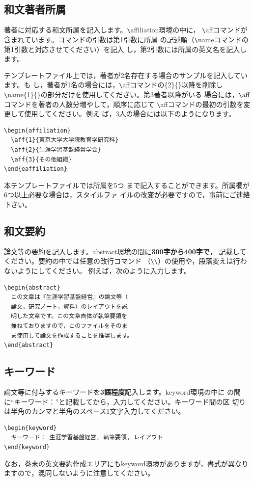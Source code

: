 \documentclass[b5paper,10pt,twocolumn,tombow]{jarticle}
\begin{document}
\subsection{和文著者所属}
著者に対応する和文所属を記入します。\verb|\|affiliation環境の中に，
\verb|\|affコマンドが含まれています。コマンドの引数は第1引数に所属
の記述順（\verb|\|nameコマンドの第1引数と対応させてください）を記入
し，第2引数には所属の英文名を記入します。


テンプレートファイル上では，著者が2名存在する場合のサンプルを記入しています。も
し，著者が1名の場合には，\verb|\|affコマンドの\{2\}\{\}以降を削除し
\verb|\|name\{1\}\{\}の部分だけを使用してください。第3著者以降がいる
場合には，\verb|\|affコマンドを著者の人数分増やして，順序に応じて
\verb|\|affコマンドの最初の引数を変更して使用してください。例え
ば，3人の場合には以下のようになります。

\begin{verbatim}
\begin{affiliation}
  \aff{1}{東京大学大学院教育学研究科}
  \aff{2}{生涯学習基盤経営学会}
  \aff{3}{その他組織}
\end{eaffiliation}
\end{verbatim}
本テンプレートファイルでは所属を5つ
まで記入することができます。所属欄が6つ以上必要な場合は，スタイルファ
イルの改変が必要ですので，事前にご連絡下さい。


\subsection{和文要約}
論文等の要約を記入します。abstract環境の間に\textbf{300字から400字で}，
記載してください。要約の中では任意の改行コマンド
（\verb|\|\verb|\|）の使用や，段落変えは行わないようにしてください。
例えば，次のように入力します。
\begin{verbatim}
\begin{abstract}
  この文章は『生涯学習基盤経営』の論文等（
  論文，研究ノート，資料）のレイアウトを説
  明した文章です。この文章自体が執筆要領を
  兼ねておりますので，このファイルをそのま
  ま使用して論文を作成することを推奨します。
\end{abstract}
\end{verbatim}


\subsection{キーワード}
論文等に付与するキーワードを\textbf{3語程度}記入します。keyword環境の中に
の間に``キーワード：''と記載してから，入力してください。キーワード間の区
切りは半角のカンマと半角のスペース1文字入力してください。
\begin{verbatim}
\begin{keyword}
  キーワード： 生涯学習基盤経営, 執筆要領, レイアウト
\end{keyword}
\end{verbatim}
なお，巻末の英文要約作成エリアにもkeyword環境がありますが，書式が異なり
ますので，混同しないように注意してください。
\end{document}
